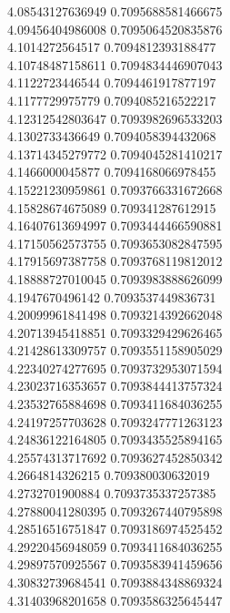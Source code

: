 {4.08543127636949 0.7095688581466675 \\
4.09456404986008 0.7095064520835876 \\
4.1014272564517 0.7094812393188477 \\
4.10748487158611 0.7094834446907043 \\
4.1122723446544 0.7094461917877197 \\
4.1177729975779 0.7094085216522217 \\
4.12312542803647 0.7093982696533203 \\
4.1302733436649 0.7094058394432068 \\
4.13714345279772 0.7094045281410217 \\
4.1466000045877 0.7094168066978455 \\
4.15221230959861 0.7093766331672668 \\
4.15828674675089 0.709341287612915 \\
4.16407613694997 0.7093444466590881 \\
4.17150562573755 0.7093653082847595 \\
4.17915697387758 0.7093768119812012 \\
4.18888727010045 0.7093983888626099 \\
4.1947670496142 0.7093537449836731 \\
4.20099961841498 0.7093214392662048 \\
4.20713945418851 0.7093329429626465 \\
4.21428613309757 0.7093551158905029 \\
4.22340274277695 0.7093732953071594 \\
4.23023716353657 0.7093844413757324 \\
4.23532765884698 0.7093411684036255 \\
4.24197257703628 0.7093247771263123 \\
4.24836122164805 0.7093435525894165 \\
4.25574313717692 0.7093627452850342 \\
4.2664814326215 0.709380030632019 \\
4.2732701900884 0.7093735337257385 \\
4.27880041280395 0.7093267440795898 \\
4.28516516751847 0.7093186974525452 \\
4.29220456948059 0.7093411684036255 \\
4.29897570925567 0.7093583941459656 \\
4.30832739684541 0.7093884348869324 \\
4.31403968201658 0.7093586325645447 \\
}
